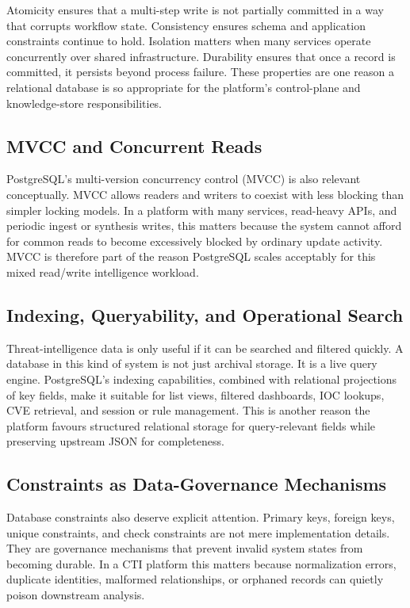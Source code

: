 Atomicity ensures that a multi-step write is not partially committed in a way that corrupts workflow state. Consistency ensures schema and application constraints continue to hold. Isolation matters when many services operate concurrently over shared infrastructure. Durability ensures that once a record is committed, it persists beyond process failure. These properties are one reason a relational database is so appropriate for the platform's control-plane and knowledge-store responsibilities.

\subsection{MVCC and Concurrent Reads}
PostgreSQL's multi-version concurrency control (MVCC) is also relevant conceptually. MVCC allows readers and writers to coexist with less blocking than simpler locking models. In a platform with many services, read-heavy APIs, and periodic ingest or synthesis writes, this matters because the system cannot afford for common reads to become excessively blocked by ordinary update activity. MVCC is therefore part of the reason PostgreSQL scales acceptably for this mixed read/write intelligence workload.

\subsection{Indexing, Queryability, and Operational Search}
Threat-intelligence data is only useful if it can be searched and filtered quickly. A database in this kind of system is not just archival storage. It is a live query engine. PostgreSQL's indexing capabilities, combined with relational projections of key fields, make it suitable for list views, filtered dashboards, IOC lookups, CVE retrieval, and session or rule management. This is another reason the platform favours structured relational storage for query-relevant fields while preserving upstream JSON for completeness.

\subsection{Constraints as Data-Governance Mechanisms}
Database constraints also deserve explicit attention. Primary keys, foreign keys, unique constraints, and check constraints are not mere implementation details. They are governance mechanisms that prevent invalid system states from becoming durable. In a CTI platform this matters because normalization errors, duplicate identities, malformed relationships, or orphaned records can quietly poison downstream analysis.

